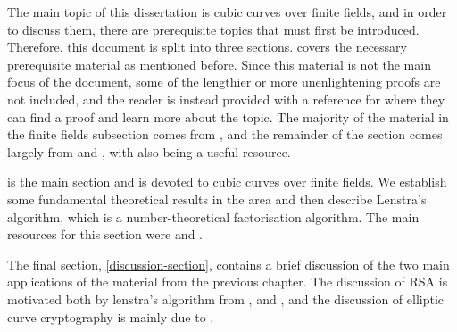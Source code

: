 The main topic of this dissertation is cubic curves over finite fields, and in order to discuss them, there are prerequisite topics that must first be introduced.
Therefore, this document is split into three sections.
 covers the necessary prerequisite material as mentioned before.
Since this material is not the main focus of the document, some of the lengthier or more unenlightening proofs are not included, and the reader is instead provided with a reference for where they can find a proof and learn more about the topic.
The majority of the material in the finite fields subsection comes from \cite{111-lectures}, and the remainder of the section comes largely from \cite{323-lectures} and \cite{bix2006}, with \cite{silverman2009} also being a useful resource.

 is the main section and is devoted to cubic curves over finite fields.
We establish some fundamental theoretical results in the area and then describe Lenstra's algorithm, which is a number-theoretical factorisation algorithm.
The main resources for this section were \cite{tate2013} and \cite{silverman2009}.

The final section, \cref{discussion-section}, contains a brief discussion of the two main applications of the material from the previous chapter.
The discussion of RSA is motivated both by lenstra's algorithm from \cite{lenstra1987}, \cite{tate2013} and \cite{menezes1996}, and the discussion of elliptic curve cryptography is mainly due to \cite{tate2013}.
